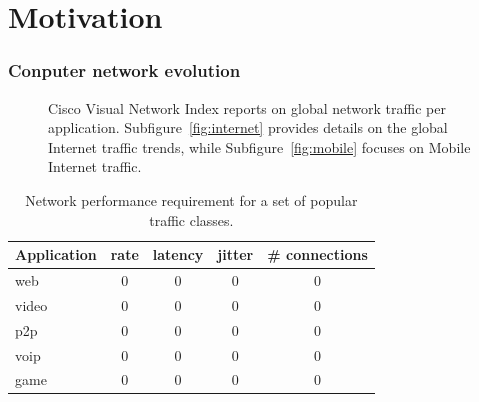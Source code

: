 \section{Motivation} \label{sec:intro:motivations}

\subsubsection*{Conputer network evolution}

\begin{figure}[ht] \centering {}
  \caption{Cisco Visual Network Index reports on global network traffic per
    application. Subfigure~\ref{fig:internet} provides details on the global
    Internet traffic trends, while Subfigure~\ref{fig:mobile} focuses on Mobile
    Internet traffic.} \label{fig:internet_applications} \end{figure}


\begin{table} \begin{center} \begin{tabular}{ | l | c c c c | } \hline
      Application  & rate & latency & jitter  & \# connections \\ \hline web
      & 0    & 0       & 0      & 0\\ video        & 0    & 0       & 0      &
      0\\ p2p          & 0    & 0       & 0      & 0\\ voip         & 0    & 0
      & 0      & 0\\ game         & 0    & 0       & 0      & 0\\ \hline
    \end{tabular} \end{center} \caption{Network performance requirement for a
    set of popular traffic classes.} \label{tbl:application_requirement}
\end{table}

